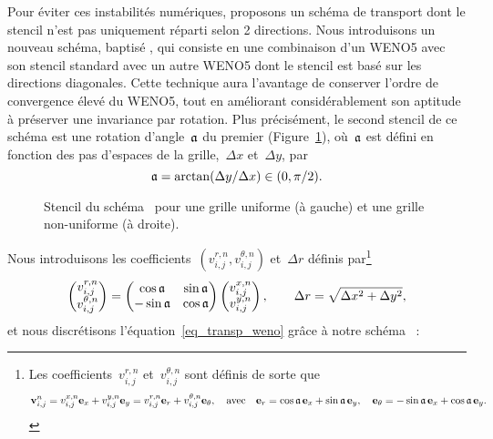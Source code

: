 \documentclass[main.tex]{subfiles}
\begin{document}
Pour éviter ces instabilités numériques, proposons un schéma de transport dont le stencil n'est pas uniquement réparti selon 2 directions. 
Nous introduisons un nouveau schéma, baptisé \twinweno, qui consiste en une combinaison d'un WENO5 avec son stencil standard avec un autre WENO5 dont le stencil est basé sur les directions diagonales. Cette technique aura l'avantage de conserver l'ordre de convergence élevé du WENO5, tout en améliorant considérablement son aptitude à préserver une invariance par rotation. Plus précisément, le second stencil de ce schéma est une rotation d'angle~${\mathfrak{a}}$ du premier (\cf Figure~\ref{fig:stencil_weno5_twin}), où~${\mathfrak{a}}$ est défini en fonction des pas d'espaces de la grille,~$\Delta x$ et~$\Delta y$, par
\begin{equation}\label{eq:angle_twinweno}
{\mathfrak{a}}=\arctan (\Delta y/\Delta x)\in (0,\pi/2).
\end{equation}
\begin{figure}[h]
  \centering
\subfloat[Grille uniforme~$\thickmuskip=1mu  \Delta x=\Delta y$]{}
\caption{Stencil du schéma \twinweno\ pour une grille uniforme (à gauche)
  et une grille non-uniforme (à droite).} \label{fig:stencil_weno5_twin}
\end{figure} 
Nous introduisons les coefficients~$(v^{r,n}_{i,j},
v^{\theta,n}_{i,j})$ et~$\Delta r$ définis par\footnote{Les coefficients~$v^{r,n}_{i,j}$
  et~$v^{\theta,n}_{i,j}$ sont définis de sorte que 
$$\mathbf{v}^n_{i,j}=v^{x,n}_{i,j}{\bf e}_x+v^{y,n}_{i,j}{\bf e}_y=v^{r,n}_{i,j}{\bf e}_r+v^{\theta,n}_{i,j}{\bf e}_{\theta},\quad\text{avec}\quad 
{\bf e}_r=\cos{\mathfrak{a}}\,{\bf e}_x+\sin{\mathfrak{a}}\,{\bf e}_y,\quad {\bf e}_{\theta}=-\sin{\mathfrak{a}}\,{\bf e}_x+\cos{\mathfrak{a}}\, {\bf e}_y.$$}
\begin{equation}
\begin{pmatrix}
v^{r,n}_{i,j} \\ v^{\theta,n}_{i,j}
\end{pmatrix} = \begin{pmatrix}
\cos {\mathfrak{a}} & \sin {\mathfrak{a}} \\ -\sin {\mathfrak{a}} & \cos {\mathfrak{a}}
\end{pmatrix} \begin{pmatrix}
v^{x,n}_{i,j} \\ v^{y,n}_{i,j}
\end{pmatrix}, \qquad  \Delta r=\sqrt{\Delta x^2+\Delta y^2},
\end{equation}
et nous discrétisons l'équation~\eqref{eq_transp_weno} grâce à notre schéma \twinweno\ : 
\end{document}
